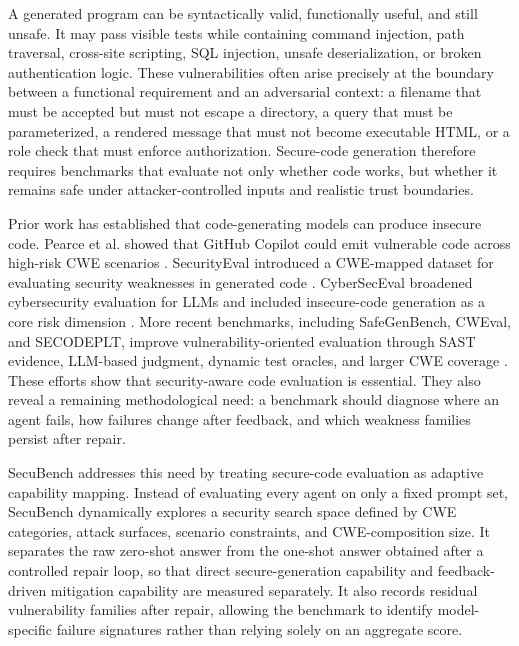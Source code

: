 \documentclass[11pt]{article}
\newcommand{\toolname}{SecuBench}
\begin{document}
A generated program can be syntactically valid, functionally useful, and still unsafe. It may pass visible tests while containing command injection, path traversal, cross-site scripting, SQL injection, unsafe deserialization, or broken authentication logic. These vulnerabilities often arise precisely at the boundary between a functional requirement and an adversarial context: a filename that must be accepted but must not escape a directory, a query that must be parameterized, a rendered message that must not become executable HTML, or a role check that must enforce authorization. Secure-code generation therefore requires benchmarks that evaluate not only whether code works, but whether it remains safe under attacker-controlled inputs and realistic trust boundaries.

Prior work has established that code-generating models can produce insecure code. Pearce et al. showed that GitHub Copilot could emit vulnerable code across high-risk CWE scenarios \cite{pearce2022asleep}. SecurityEval introduced a CWE-mapped dataset for evaluating security weaknesses in generated code \cite{siddiq2022securityeval}. CyberSecEval broadened cybersecurity evaluation for LLMs and included insecure-code generation as a core risk dimension \cite{bhatt2023cyberseceval}. More recent benchmarks, including SafeGenBench, CWEval, and SECODEPLT, improve vulnerability-oriented evaluation through SAST evidence, LLM-based judgment, dynamic test oracles, and larger CWE coverage \cite{li2025safegenbench,peng2025cweval,nie2025secodeplt}. These efforts show that security-aware code evaluation is essential. They also reveal a remaining methodological need: a benchmark should diagnose where an agent fails, how failures change after feedback, and which weakness families persist after repair.

\toolname{} addresses this need by treating secure-code evaluation as adaptive capability mapping. Instead of evaluating every agent on only a fixed prompt set, \toolname{} dynamically explores a security search space defined by CWE categories, attack surfaces, scenario constraints, and CWE-composition size. It separates the raw zero-shot answer from the one-shot answer obtained after a controlled repair loop, so that direct secure-generation capability and feedback-driven mitigation capability are measured separately. It also records residual vulnerability families after repair, allowing the benchmark to identify model-specific failure signatures rather than relying solely on an aggregate score.
\end{document}
